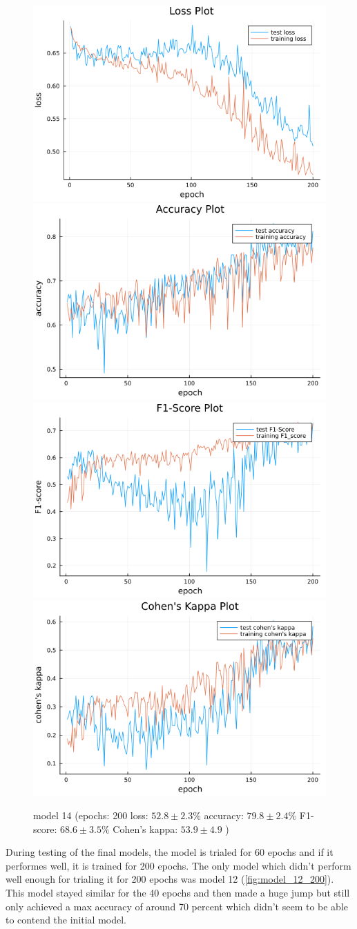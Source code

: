 \documentclass[
a4paper, 
12pt,
grayscalebody, %
abstract=on,
twoside, BCOR10mm, 12pt, DIV13,headinclude, footexclude, final, abstracton, openright
]{ibireprt}
\numberwithin{equation}{chapter}
\numberwithin{table}{chapter}
\numberwithin{figure}{chapter}
\numberwithin{algorithm}{chapter}
\numberwithin{example}{chapter}
\numberwithin{example}{chapter}
\begin{document}
\begin{figure}
	\includegraphics[width=0.4\linewidth]{loss_png_14_4.png}\hfill
	\includegraphics[width=0.4\linewidth]{accuracy_png_14_4.png}
	\\[\smallskipamount]
	\includegraphics[width=0.4\linewidth]{f1_score_png_14_4.png}\hfill
	\includegraphics[width=0.4\linewidth]{cohens_kappa_png_14_4.png}
	\caption{model 14 (epochs: 200 loss: $52.8\pm2.3\% $ accuracy: $79.8\pm2.4\%$ F1-score: $68.6\pm3.5\%$  Cohen's kappa: $53.9\pm4.9$ )}
	\label{fig:model_14_200}
\end{figure}
	\clearpage 
	
During testing of the final models, the model is trialed for 60 epochs and if it performes well, it is trained for 200 epochs. The only model which didn't perform well enough for trialing it for 200 epochs was model 12 (\ref{fig:model_12_200}). This model stayed similar for the 40 epochs and then made a huge jump but still only achieved a max accuracy of around 70 percent which didn't seem to be able to contend the initial model. 
\end{document}
